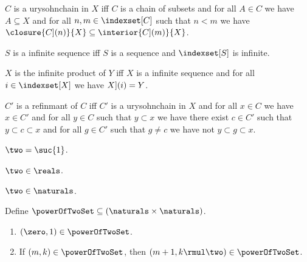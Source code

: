\begin{definition}\label{urysohnchain_without_cardinality}
    $C$ is a urysohnchain in $X$ iff
    $C$ is a chain of subsets and
    for all $A \in C$ we have $A \subseteq X$ and
    for all $n,m \in \indexset[C]$ such that $n < m$ we have $\closure{\index[C](n)}{X} \subseteq \interior{\index[C](m)}{X}$.
\end{definition}

\begin{abbreviation}\label{infinte_sequence}
    $S$ is a infinite sequence iff $S$ is a sequence and $\indexset[S]$ is infinite.
\end{abbreviation}

\begin{definition}\label{infinite_product}
    $X$ is the infinite product of $Y$ iff
    $X$ is a infinite sequence and for all $i \in \indexset[X]$ we have $\index[X](i) = Y$.
\end{definition}

\begin{definition}\label{refinmant}
    $C'$ is a refinmant of $C$ iff $C'$ is a urysohnchain in $X$
    and for all $x \in C$ we have $x \in C'$ 
    and for all $y \in C$ such that $y \subset x$ we have there exist $c \in C'$ such that $y \subset c \subset x$
    and for all $g \in C'$ such that $g \neq c$ we have not $y \subset g \subset x$.
\end{definition}

\begin{abbreviation}\label{two}
    $\two = \suc{1}$.
\end{abbreviation}

\begin{lemma}\label{two_in_reals}
    $\two \in \reals$.
\end{lemma}

\begin{lemma}\label{two_in_naturals}
    $\two \in \naturals$.
\end{lemma}

\begin{inductive}\label{power_of_two}
    Define $\powerOfTwoSet \subseteq (\naturals \times \naturals)$.
    \begin{enumerate}
        \item  $(\zero, 1) \in \powerOfTwoSet$.
        \item  If $(m,k) \in \powerOfTwoSet$, then $(m+1, k \rmul \two) \in \powerOfTwoSet$.
    \end{enumerate}
\end{inductive}

